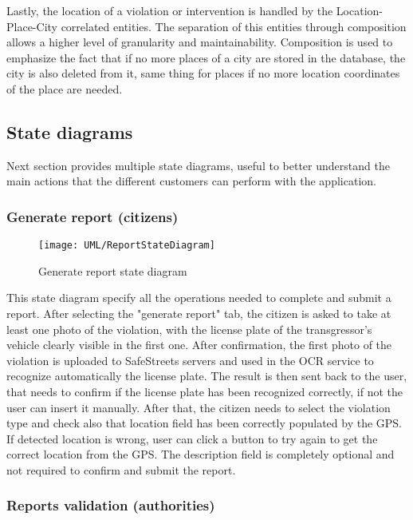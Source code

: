 Lastly, the location of a violation or intervention is handled by the Location-Place-City correlated entities. The separation of this entities through composition allows a higher level of granularity and maintainability. Composition is used to emphasize the fact that if no more places of a city are stored in the database, the city is also deleted from it, same thing for places if no more location coordinates of the place are needed.

\subsection{State diagrams}

Next section provides multiple state diagrams, useful to better understand the main actions that the different customers can perform with the application.

\subsubsection{Generate report (citizens)}

\begin{figure}[H]
	\centering
	\texttt{[image: UML/ReportStateDiagram]}
	\caption{Generate report state diagram}
\end{figure}

This state diagram specify all the operations needed to complete and submit a report. After selecting the "generate report" tab, the citizen is asked to take at least one photo of the violation, with the license plate of the transgressor's vehicle clearly visible in the first one. After confirmation, the first photo of the violation is uploaded to SafeStreets servers and used in the OCR service to recognize automatically the license plate. The result is then sent back to the user, that needs to confirm if the license plate has been recognized correctly, if not the user can insert it manually. After that, the citizen needs to select the violation type and check also that location field has been correctly populated by the GPS. If detected location is wrong, user can click a button to try again to get the correct location from the GPS. The description field is completely optional and not required to confirm and submit the report.

\subsubsection{Reports validation (authorities)}

